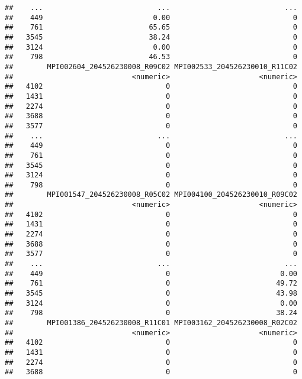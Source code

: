 \documentclass[
]{article}
\begin{document}
\begin{verbatim}
##    ...                           ...                           ...
##    449                          0.00                             0
##    761                         65.65                             0
##   3545                         38.24                             0
##   3124                          0.00                             0
##    798                         46.53                             0
##        MPI002604_204526230008_R09C02 MPI002533_204526230010_R11C02
##                            <numeric>                     <numeric>
##   4102                             0                             0
##   1431                             0                             0
##   2274                             0                             0
##   3688                             0                             0
##   3577                             0                             0
##    ...                           ...                           ...
##    449                             0                             0
##    761                             0                             0
##   3545                             0                             0
##   3124                             0                             0
##    798                             0                             0
##        MPI001547_204526230008_R05C02 MPI004100_204526230010_R09C02
##                            <numeric>                     <numeric>
##   4102                             0                             0
##   1431                             0                             0
##   2274                             0                             0
##   3688                             0                             0
##   3577                             0                             0
##    ...                           ...                           ...
##    449                             0                          0.00
##    761                             0                         49.72
##   3545                             0                         43.98
##   3124                             0                          0.00
##    798                             0                         38.24
##        MPI001386_204526230008_R11C01 MPI003162_204526230008_R02C02
##                            <numeric>                     <numeric>
##   4102                             0                             0
##   1431                             0                             0
##   2274                             0                             0
##   3688                             0                             0

\end{verbatim}
\end{document}
